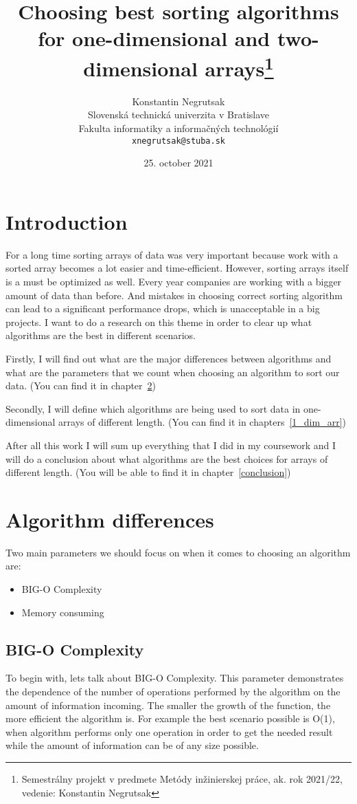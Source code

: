 \documentclass[12pt,oneside,a4paper]{article}
\title{Choosing best sorting algorithms for one-dimensional and two-dimensional arrays\thanks{Semestrálny projekt v predmete Metódy inžinierskej práce, ak. rok 2021/22, vedenie: Konstantin Negrutsak}}
\author{Konstantin Negrutsak\\[2pt]
	{\small Slovenská technická univerzita v Bratislave}\\
	{\small Fakulta informatiky a informačných technológií}\\
	{\small \texttt{xnegrutsak@stuba.sk}}
	}
\date{\small 25. october 2021}
\begin{document}
\maketitle


\section{Introduction}
For a long time sorting arrays of data was very important because work with a sorted array becomes a lot easier and time-efficient. However, sorting arrays itself is a must be optimized as well. Every year companies are working with a bigger amount of data than before. And mistakes in choosing correct sorting algorithm can lead to a significant performance drops, which is unacceptable in a big projects. I want to do a research on this theme in order to clear up what algorithms are the best in different scenarios.


Firstly, I will find out what are the major differences between algorithms and what are the parameters that we count when choosing an algorithm to sort our data.
(You can find it in chapter~\ref{alg_diff})

Secondly, I will define which algorithms are being used to sort data in one-dimensional arrays of different length.
(You can find it in chapters~\ref{1_dim_arr})

After all this work I will sum up everything that I did in my coursework and I will do a conclusion about what algorithms are the best choices for arrays of different length. (You will be able to find it in chapter~\ref{conclusion})

\section{Algorithm differences} \label{alg_diff}

Two main parameters we should focus on when it comes to choosing an algorithm are:

\begin{itemize}
\item BIG-O Complexity
\item Memory consuming
\end{itemize}

\subsection{BIG-O Complexity}
To begin with, lets talk about BIG-O Complexity. This parameter demonstrates the dependence of the number of operations performed by the algorithm on the amount of information incoming. The smaller the growth of the function, the more efficient the algorithm is.
For example the best scenario possible is O(1), when algorithm performs only one operation in order to get the needed result while the amount of information can be of any size possible.
\end{document}
